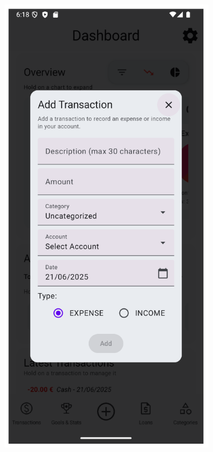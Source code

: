 \documentclass[a4paper,12pt]{article}
\begin{document}
\begin{figure}[H]
\begin{subfigure}[b]{0.23\textwidth}
        \includegraphics[width=\textwidth]{add_transaction_dialog.png}

\end{subfigure}
\end{figure}
\end{document}
